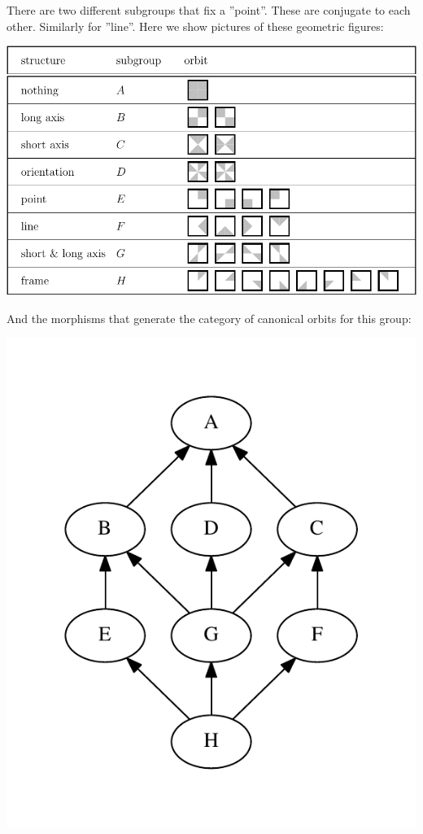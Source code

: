 \documentclass[11pt,oneside]{article}
\begin{document}
There are two different subgroups that fix a ''point''.
These are conjugate to each other.
Similarly for ''line''.
Here we show pictures of these geometric figures:

\begin{center}
\includegraphics[]{pic-square-structures.pdf} 
\end{center}

And the morphisms that generate the category of canonical orbits for this
group:
\begin{center}
\includegraphics[width=0.4\columnwidth]{subgroups_d8.pdf} 
\end{center}


\end{document}
